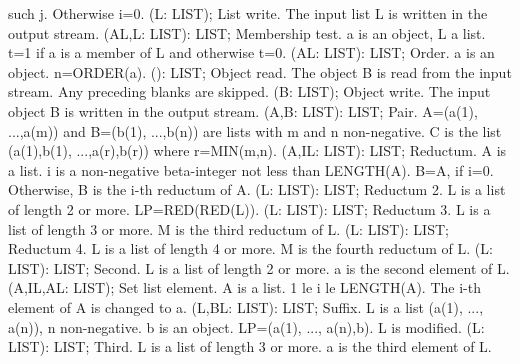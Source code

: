 such j. Otherwise i=0. \ecom 
{} (L: LIST); \eproc
\bcom List write. The input list L is written in the output stream. \ecom 
{} (AL,L: LIST): LIST; \eproc
\bcom Membership test. a is an object, L a list. t=1 if a is a
member of L and otherwise t=0. \ecom 
{} (AL: LIST): LIST; \eproc
\bcom Order. a is an object. n=ORDER(a). \ecom 
{} (): LIST; \eproc
\bcom Object read. The object B is read from the input stream. Any
preceding blanks are skipped. \ecom 
{} (B: LIST); \eproc
\bcom Object write. The input object B is written in the output stream. \ecom 
{} (A,B: LIST): LIST; \eproc
\bcom Pair. A=(a(1), ...,a(m)) and B=(b(1), ...,b(n)) are lists with
m and n non-negative.  C is the list (a(1),b(1), ...,a(r),b(r))
where r=MIN(m,n). \ecom 
{} (A,IL: LIST): LIST; \eproc
\bcom Reductum. A is a list. i is a non-negative beta-integer not less
than LENGTH(A).  B=A, if i=0.  Otherwise, B is the i-th reductum of
A. \ecom 
{} (L: LIST): LIST; \eproc
\bcom Reductum 2. L is a list of length 2 or more. LP=RED(RED(L)). \ecom 
{} (L: LIST): LIST; \eproc
\bcom Reductum 3. L is a list of length 3 or more. M is the third
reductum of L. \ecom 
{} (L: LIST): LIST; \eproc
\bcom Reductum 4. L is a list of length 4 or more. M is the fourth
reductum of L. \ecom 
{} (L: LIST): LIST; \eproc
\bcom Second. L is a list of length 2 or more. a is the second element
of L. \ecom 
{} (A,IL,AL: LIST); \eproc
\bcom Set list element. A is a list. 1 le i le LENGTH(A). The i-th
element of A is changed to a. \ecom 
{} (L,BL: LIST): LIST; \eproc
\bcom Suffix. L is a list (a(1), ..., a(n)), n non-negative. b is an
object. LP=(a(1), ..., a(n),b). L is modified. \ecom 
{} (L: LIST): LIST; \eproc
\bcom Third. L is a list of length 3 or more. a is the third element
of L. \ecom 
